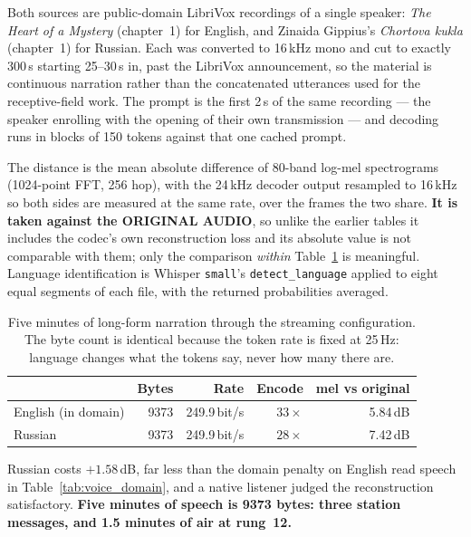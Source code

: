 Both sources are public-domain LibriVox recordings of a single speaker:
\emph{The Heart of a Mystery} (chapter~1) for English, and Zinaida
Gippius's \emph{Chortova kukla} (chapter~1) for Russian.  Each was
converted to 16\,kHz mono and cut to exactly 300\,s starting 25--30\,s
in, past the LibriVox announcement, so the material is continuous
narration rather than the concatenated utterances used for the
receptive-field work.  The prompt is the first 2\,s of the same
recording --- the speaker enrolling with the opening of their own
transmission --- and decoding runs in blocks of 150 tokens against that
one cached prompt.

The distance is the mean absolute difference of 80-band log-mel
spectrograms (1024-point FFT, 256 hop), with the 24\,kHz decoder output
resampled to 16\,kHz so both sides are measured at the same rate, over
the frames the two share.  \textbf{It is taken against the ORIGINAL
AUDIO}, so unlike the earlier tables it includes the codec's own
reconstruction loss and its absolute value is not comparable with them;
only the comparison \emph{within} Table~\ref{tab:voice_longform} is
meaningful.  Language identification is Whisper \texttt{small}'s
\texttt{detect\_language} applied to eight equal segments of each file,
with the returned probabilities averaged.

\begin{table}[H]
    \centering
    \caption{Five minutes of long-form narration through the streaming
             configuration.  The byte count is identical because the
             token rate is fixed at 25\,Hz: language changes what the
             tokens say, never how many there are.}
    \label{tab:voice_longform}
    \small
    \begin{tabular}{@{}lrrrr@{}}
    \toprule
    & \textbf{Bytes} & \textbf{Rate} & \textbf{Encode} &
    \textbf{mel vs original} \\
    \midrule
    English (in domain) & 9373 & 249.9\,bit/s & $33\times$ & 5.84\,dB \\
    Russian             & 9373 & 249.9\,bit/s & $28\times$ & 7.42\,dB \\
    \bottomrule
    \end{tabular}
\end{table}

Russian costs $+1.58$\,dB, far less than the domain penalty on English
read speech in Table~\ref{tab:voice_domain}, and a native listener
judged the reconstruction satisfactory.  \textbf{Five minutes of speech
is 9373 bytes: three station messages, and 1.5 minutes of air at
rung~12.}

